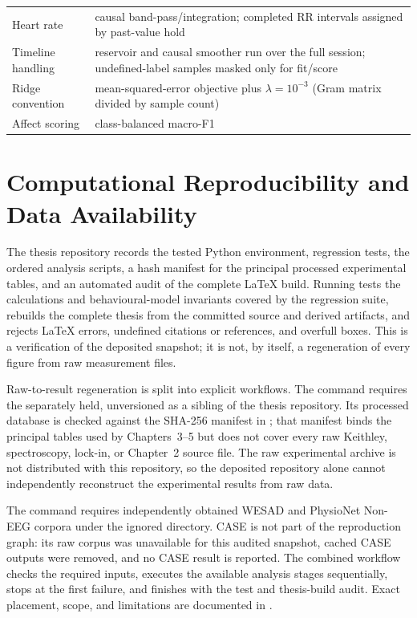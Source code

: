 \begin{table}[t]
\begin{tabularx}{\linewidth}{@{}>{\raggedright\arraybackslash}p{3.4cm}X@{}}
    Heart rate & causal band-pass/integration; completed RR intervals assigned by past-value hold \\
    Timeline handling & reservoir and causal smoother run over the full session; undefined-label samples masked only for fit/score \\
    Ridge convention & mean-squared-error objective plus $\lambda=10^{-3}$ (Gram matrix divided by sample count) \\
    Affect scoring & class-balanced macro-F1 \\
    \bottomrule
  \end{tabularx}
\end{table}

\section{Computational Reproducibility and Data Availability}\label{app:reproducibility}

The thesis repository records the tested Python environment, regression tests,
the ordered analysis scripts, a hash manifest for the principal processed
experimental tables, and an automated audit of the complete \LaTeX{} build.
Running  tests the calculations and behavioural-model
invariants covered by the regression suite, rebuilds the complete thesis from
the committed source and derived artifacts, and rejects LaTeX{} errors,
undefined citations or references, and overfull boxes. This is a verification
of the deposited snapshot; it is not, by itself, a regeneration of every figure
from raw measurement files.

Raw-to-result regeneration is split into explicit workflows. The command
 requires the separately held, unversioned
 as a sibling of the thesis repository. Its
processed database is checked against the SHA-256 manifest in
; that manifest binds the principal
tables used by Chapters~3--5 but does not cover every raw Keithley,
spectroscopy, lock-in, or Chapter~2 source file. The raw experimental archive is
not distributed with this repository, so the deposited repository alone cannot
independently reconstruct the experimental results from raw data.

The command  requires independently obtained WESAD
and PhysioNet Non-EEG corpora under the ignored  directory. CASE is
not part of the reproduction graph: its raw corpus was unavailable for this
audited snapshot, cached CASE outputs were removed, and no CASE result is
reported. The combined  workflow checks the required
inputs, executes the available analysis stages sequentially, stops at the first
failure, and finishes with the test and thesis-build audit. Exact placement,
scope, and limitations are documented in .

